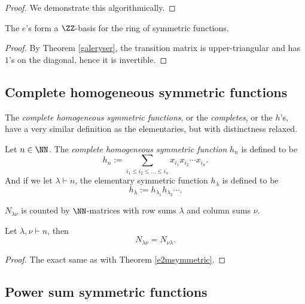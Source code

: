 \documentclass{article}
\begin{document}
\begin{proof}
    We demonstrate this algorithmically.
\end{proof}
\begin{theorem} The $e$'s form a $\ZZ$-basis for the ring of symmetric functions.
\end{theorem}

\begin{proof}
    By Theorem \ref{galeryser}, the transition matrix is upper-triangular and has $1$'s on the diagonal, hence it is invertible. 
\end{proof}

\subsection{Complete homogeneous symmetric functions}

The \textit{complete homogeneous symmetric functions}, or the \textit{completes}, or the $h$'s, have a very similar definition as the elementaries, but with distinctness relaxed.

\begin{definition}
    Let $n\in\NN$. The \textit{complete homogeneous symmetric function} $h_n$ is defined to be
    \[
        h_n := \sum_{i_1\leq i_2\leq\ldots\leq i_n} x_{i_1}x_{i_2}\cdots x_{i_n}.
    \]
    And if we let $\lambda \vdash n$, the elementary symmetric function $h_\lambda$ is defined to be
    \[
        h_\lambda := h_{\lambda_1}h_{\lambda_2}\cdots.
    \]
\end{definition}

\begin{theorem}
    $N_{\lambda\nu}$ is counted by $\NN$-matrices with row sums $\lambda$ and column sums $\nu$.
\end{theorem}

\begin{theorem}
    Let $\lambda, \nu \vdash n$, then
    \[
        N_{\lambda\nu} = N_{\nu\lambda}.
    \]
\end{theorem}

\begin{proof}
    The exact same as with Theorem \ref{e2msymmetric}.
\end{proof}

\subsection{Power sum symmetric functions}
\end{document}
